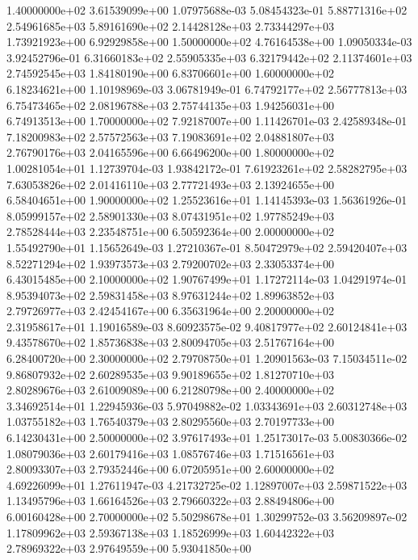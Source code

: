 \documentclass{article}
\begin{document}
\begin{center}
{   1.40000000e+02   3.61539099e+00   1.07975688e-03   5.08454323e-01   5.88771316e+02   2.54961685e+03   5.89161690e+02   2.14428128e+03   2.73344297e+03   1.73921923e+00   6.92929858e+00
   1.50000000e+02   4.76164538e+00   1.09050334e-03   3.92452796e-01   6.31660183e+02   2.55905335e+03   6.32179442e+02   2.11374601e+03   2.74592545e+03   1.84180190e+00   6.83706601e+00
   1.60000000e+02   6.18234621e+00   1.10198969e-03   3.06781949e-01   6.74792177e+02   2.56777813e+03   6.75473465e+02   2.08196788e+03   2.75744135e+03   1.94256031e+00   6.74913513e+00
   1.70000000e+02   7.92187007e+00   1.11426701e-03   2.42589348e-01   7.18200983e+02   2.57572563e+03   7.19083691e+02   2.04881807e+03   2.76790176e+03   2.04165596e+00   6.66496200e+00
   1.80000000e+02   1.00281054e+01   1.12739704e-03   1.93842172e-01   7.61923261e+02   2.58282795e+03   7.63053826e+02   2.01416110e+03   2.77721493e+03   2.13924655e+00   6.58404651e+00
   1.90000000e+02   1.25523616e+01   1.14145393e-03   1.56361926e-01   8.05999157e+02   2.58901330e+03   8.07431951e+02   1.97785249e+03   2.78528444e+03   2.23548751e+00   6.50592364e+00
   2.00000000e+02   1.55492790e+01   1.15652649e-03   1.27210367e-01   8.50472979e+02   2.59420407e+03   8.52271294e+02   1.93973573e+03   2.79200702e+03   2.33053374e+00   6.43015485e+00
   2.10000000e+02   1.90767499e+01   1.17272114e-03   1.04291974e-01   8.95394073e+02   2.59831458e+03   8.97631244e+02   1.89963852e+03   2.79726977e+03   2.42454167e+00   6.35631964e+00
   2.20000000e+02   2.31958617e+01   1.19016589e-03   8.60923575e-02   9.40817977e+02   2.60124841e+03   9.43578670e+02   1.85736838e+03   2.80094705e+03   2.51767164e+00   6.28400720e+00
   2.30000000e+02   2.79708750e+01   1.20901563e-03   7.15034511e-02   9.86807932e+02   2.60289535e+03   9.90189655e+02   1.81270710e+03   2.80289676e+03   2.61009089e+00   6.21280798e+00
   2.40000000e+02   3.34692514e+01   1.22945936e-03   5.97049882e-02   1.03343691e+03   2.60312748e+03   1.03755182e+03   1.76540379e+03   2.80295560e+03   2.70197733e+00   6.14230431e+00
   2.50000000e+02   3.97617493e+01   1.25173017e-03   5.00830366e-02   1.08079036e+03   2.60179416e+03   1.08576746e+03   1.71516561e+03   2.80093307e+03   2.79352446e+00   6.07205951e+00
   2.60000000e+02   4.69226099e+01   1.27611947e-03   4.21732725e-02   1.12897007e+03   2.59871522e+03   1.13495796e+03   1.66164526e+03   2.79660322e+03   2.88494806e+00   6.00160428e+00
   2.70000000e+02   5.50298678e+01   1.30299752e-03   3.56209897e-02   1.17809962e+03   2.59367138e+03   1.18526999e+03   1.60442322e+03   2.78969322e+03   2.97649559e+00   5.93041850e+00
}
\end{center}
\end{document}
